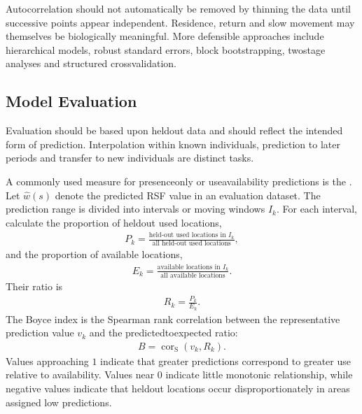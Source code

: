\documentclass[letterpaper,10pt,english]{sphinxmanual}
\begin{document}
\sphinxAtStartPar
Autocorrelation should not automatically be removed by thinning the data until successive points appear independent. Residence, return and slow movement may themselves be biologically meaningful. More defensible approaches include hierarchical models, robust standard errors, block bootstrapping, two\sphinxhyphen{}stage analyses and structured cross\sphinxhyphen{}validation.


\subsection{Model Evaluation}
\label{\detokenize{theory:model-evaluation}}
\sphinxAtStartPar
Evaluation should be based upon held\sphinxhyphen{}out data and should reflect the intended form of prediction. Interpolation within known individuals, prediction to later periods and transfer to new individuals are distinct tasks.

\sphinxAtStartPar
A commonly used measure for presence\sphinxhyphen{}only or use\textendash{}availability predictions is the . Let \(\hat{w}(s)\) denote the predicted RSF value in an evaluation dataset. The prediction range is divided into intervals or moving windows \(I_k\). For each interval, calculate the proportion of held\sphinxhyphen{}out used locations,
\begin{equation*}
\begin{split}
P_k
=
\frac{
\text{held-out used locations in }I_k
}{
\text{all held-out used locations}
},
\end{split}
\end{equation*}
\sphinxAtStartPar
and the proportion of available locations,
\begin{equation*}
\begin{split}
E_k
=
\frac{
\text{available locations in }I_k
}{
\text{all available locations}
}.
\end{split}
\end{equation*}
\sphinxAtStartPar
Their ratio is
\begin{equation*}
\begin{split}
R_k
=
\frac{P_k}{E_k}.
\end{split}
\end{equation*}
\sphinxAtStartPar
The Boyce index is the Spearman rank correlation between the representative prediction value \(v_k\) and the predicted\sphinxhyphen{}to\sphinxhyphen{}expected ratio:
\begin{equation*}
\begin{split}
B
=
\operatorname{cor}_{\mathrm{S}}
\left(
v_k,R_k
\right).
\end{split}
\end{equation*}
\sphinxAtStartPar
Values approaching \(1\) indicate that greater predictions correspond to greater use relative to availability. Values near \(0\) indicate little monotonic relationship, while negative values indicate that held\sphinxhyphen{}out locations occur disproportionately in areas assigned low predictions.
\end{document}
